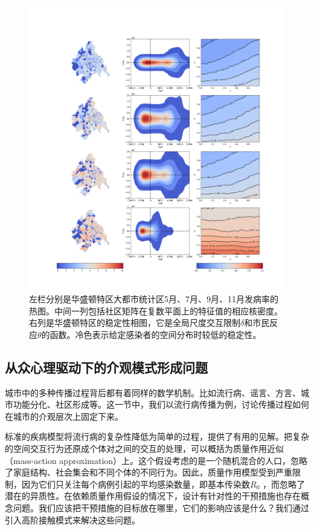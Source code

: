 \begin{figure}
    \centering
    \includegraphics[width = 0.9\linewidth]{Figs/Figure3.png}
    \caption{左栏分别是华盛顿特区大都市统计区5月、7月、9月、11月发病率的热图。中间一列包括社区矩阵在复数平面上的特征值的相应核密度。右列是华盛顿特区的稳定性相图，它是全局尺度交互限制$\delta$和市民反应$\theta$的函数。冷色表示给定感染者的空间分布时较低的稳定性。}
    \label{fig:allee3}
\end{figure}

\subsection{从众心理驱动下的介观模式形成问题}

城市中的多种传播过程背后都有着同样的数学机制\cite{gao2019effects, ribeiro2020city}。比如流行病、谣言、方言、城市功能分化、社区形成等。这一节中，我们以流行病传播为例，讨论传播过程如何在城市的介观层次上固定下来。

标准的疾病模型将流行病的复杂性降低为简单的过程，提供了有用的见解。把复杂的空间交互行为还原成个体对之间的交互的处理，可以概括为质量作用近似（mass-action approximation）上\cite{mollison1995epidemic}。这个假设考虑的是一个随机混合的人口，忽略了家庭结构、社会集会和不同个体的不同行为。因此，质量作用模型受到严重限制，因为它们只关注每个病例引起的平均感染数量，即基本传染数$R_0$ ，而忽略了潜在的异质性\cite{hebert2020beyond}。在依赖质量作用假设的情况下，设计有针对性的干预措施也存在概念问题。我们应该把干预措施的目标放在哪里，它们的影响应该是什么？我们通过引入高阶接触模式来解决这些问题。

